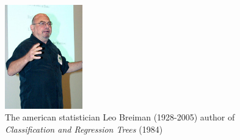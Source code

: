 \begin{figure}
    \centering
    \includegraphics[width=0.3\textwidth]{images/images_intro/Leo_Breiman.jpg}
    \caption{The american statistician Leo Breiman (1928-2005) author of \textit{Classification and Regression Trees} (1984)}
    \label{fig:leo-breiman}
\end{figure}


